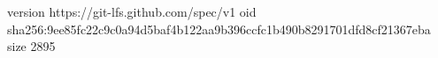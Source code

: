 version https://git-lfs.github.com/spec/v1
oid sha256:9ee85fc22c9c0a94d5baf4b122aa9b396ccfc1b490b8291701dfd8cf21367eba
size 2895
